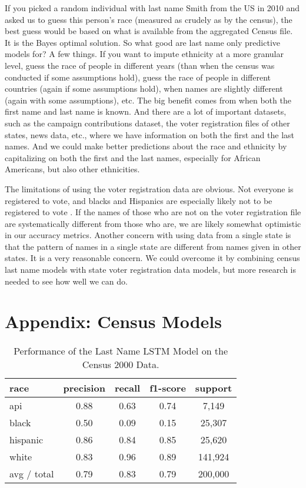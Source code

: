 \documentclass[12pt, letterpaper]{article}
\begin{document}
If you picked a random individual with last name Smith from the US in 2010 and asked us to guess this person's race (measured as crudely as by the census), the best guess would be based on what is available from the aggregated Census file. It is the Bayes optimal solution. So what good are last name only predictive models for? A few things. If you want to impute ethnicity at a more granular level, guess the race of people in different years (than when the census was conducted if some assumptions hold), guess the race of people in different countries (again if some assumptions hold), when names are slightly different (again with some assumptions), etc. The big benefit comes from when both the first name and last name is known. And there are a lot of important datasets, such as the campaign contributions dataset, the voter registration files of other states, news data, etc., where we have information on both the first and the last names. And we could make better predictions about the race and ethnicity by capitalizing on both the first and the last names, especially for African Americans, but also other ethnicities.

The limitations of using the voter registration data are obvious. Not everyone is registered to vote, and blacks and Hispanics are especially likely not to be registered to vote \citep{ansolabehere2011gender}. If the names of those who are not on the voter registration file are systematically different from those who are, we are likely somewhat optimistic in our accuracy metrics. Another concern with using data from a single state is that the pattern of names in a single state are different from names given in other states. It is a very reasonable concern. We could overcome it by combining census last name models with state voter registration data models, but more research is needed to see how well we can do.

\clearpage



\section*{Appendix: Census Models}

\begin{table}[h!]
\centering
\caption{Performance of the Last Name LSTM Model on the Census 2000 Data.}
\begin{tabular}{ l c c c c }
\hline    
   race & precision & recall & f1-score & support\\
\hline
      api      &   0.88   &  0.63  &     0.74   & 7,149\\
      black    &   0.50   &  0.09  &     0.15   & 25,307\\
   hispanic    &   0.86   &  0.84  &     0.85   & 25,620\\
      white    &   0.83   &  0.96  &     0.89   & 141,924\\

avg / total    &   0.79   &   0.83   &   0.79 &   200,000\\
\hline
\end{tabular}
\label{table:last_name_census_2000}
\end{table}
\end{document}
